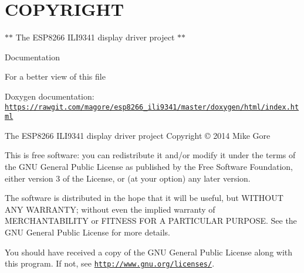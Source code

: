 \hypertarget{md_COPYRIGHT_COPYRIGHT}{}\section{C\+O\+P\+Y\+R\+I\+G\+HT}\label{md_COPYRIGHT_COPYRIGHT}
$\ast$$\ast$ The E\+S\+P8266 I\+L\+I9341 display driver project $\ast$$\ast$

\begin{DoxyParagraph}{Documentation}

\begin{DoxyItemize}
\item For a better view of this file
\item Doxygen documentation\+: \href{https://rawgit.com/magore/esp8266_ili9341/master/doxygen/html/index.html}{\tt https\+://rawgit.\+com/magore/esp8266\+\_\+ili9341/master/doxygen/html/index.\+html}
\end{DoxyItemize}
\end{DoxyParagraph}
\begin{DoxyParagraph}{The E\+S\+P8266 I\+L\+I9341 display driver project Copyright \copyright{} 2014 Mike Gore}

\end{DoxyParagraph}
This is free software\+: you can redistribute it and/or modify it under the terms of the G\+NU General Public License as published by the Free Software Foundation, either version 3 of the License, or (at your option) any later version.

The software is distributed in the hope that it will be useful, but W\+I\+T\+H\+O\+UT A\+NY W\+A\+R\+R\+A\+N\+TY; without even the implied warranty of M\+E\+R\+C\+H\+A\+N\+T\+A\+B\+I\+L\+I\+TY or F\+I\+T\+N\+E\+SS F\+OR A P\+A\+R\+T\+I\+C\+U\+L\+AR P\+U\+R\+P\+O\+SE. See the G\+NU General Public License for more details.

You should have received a copy of the G\+NU General Public License along with this program. If not, see \href{http://www.gnu.org/licenses/}{\tt http\+://www.\+gnu.\+org/licenses/}. 

